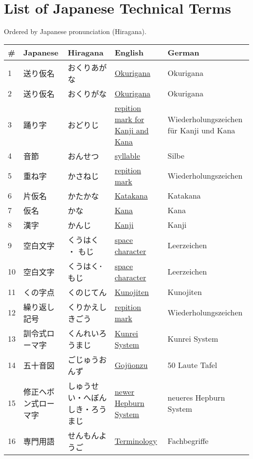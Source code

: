 \chapter{List of Japanese Technical Terms}
\label{chap:ListOfJapaneseTechnicalTerms}
\label{sec:JapaneseTechnicalTerms}
\normalsize Ordered by Japanese pronunciation (Hiragana).
\footnotesize\Padding
\begin{longtable}[c]{p{.5cm}p{3.5cm}p{4cm}p{3.5cm}p{3.5cm}}
\textbf{\#}&\textbf{Japanese}&\textbf{Hiragana}&\textbf{English}&\textbf{German}\\ \hline
1&送り仮名&おくりあがな&\hyperref[sec:Okurigana]{Okurigana}&Okurigana\\
2&送り仮名&おくりがな&\hyperref[sec:Okurigana]{Okurigana}&Okurigana\\
3&踊り字&おどりじ&\hyperref[sec:RepitionMarkForKanjiAndKana]{repition mark for Kanji and Kana}&Wiederholungszeichen für Kanji und Kana\\
4&音節&おんせつ&\hyperref[sec:Syllable]{syllable}&Silbe\\
5&重ね字&かさねじ&\hyperref[sec:RepitionMark]{repition mark}&Wiederholungszeichen\\
6&片仮名&かたかな&\hyperref[sec:Katakana]{Katakana}&Katakana\\
7&仮名&かな&\hyperref[sec:Kana]{Kana}&Kana\\
8&漢字&かんじ&\hyperref[sec:Kanji]{Kanji}&Kanji\\
9&空白文字&くうはく ・ もじ&\hyperref[sec:SpaceCharacter]{space character}&Leerzeichen\\
10&空白文字&くうはく･もじ&\hyperref[sec:SpaceCharacter]{space character}&Leerzeichen\\
11&くの字点&くのじてん&\hyperref[sec:Kunojiten]{Kunojiten}&Kunojiten\\
12&繰り返し記号&くりかえしきごう&\hyperref[sec:RepitionMark]{repition mark}&Wiederholungszeichen\\
13&訓令式ローマ字&くんれいろうまじ&\hyperref[sec:KunreiSystem]{Kunrei System}&Kunrei System\\
14&五十音図&ごじゅうおんず&\hyperref[sec:Gojuonzu]{Gojūonzu}&50 Laute Tafel\\
15&修正ヘボン式ローマ字&しゅうせい・へぼんしき・ろうまじ&\hyperref[sec:NewerHepburnSystem]{newer Hepburn System}&neueres Hepburn System\\
16&専門用語&せんもんようご&\hyperref[sec:Terminology]{Terminology}&Fachbegriffe\\

\end{longtable}
